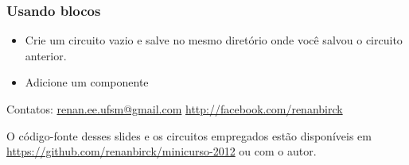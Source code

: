 \documentclass{beamer}
\begin{document}
\begin{frame}
\frametitle{Usando blocos}
\begin{itemize}
\item Crie um circuito vazio e salve no mesmo diretório onde você salvou o circuito anterior.
\item Adicione um componente
\end{itemize}
\end{frame}



\begin{frame}
Contatos: \url{renan.ee.ufsm@gmail.com} \url{http://facebook.com/renanbirck} \newline

O código-fonte desses slides e os circuitos empregados estão disponíveis em \url{https://github.com/renanbirck/minicurso-2012} ou com o autor.
\end{frame}
\end{document}
